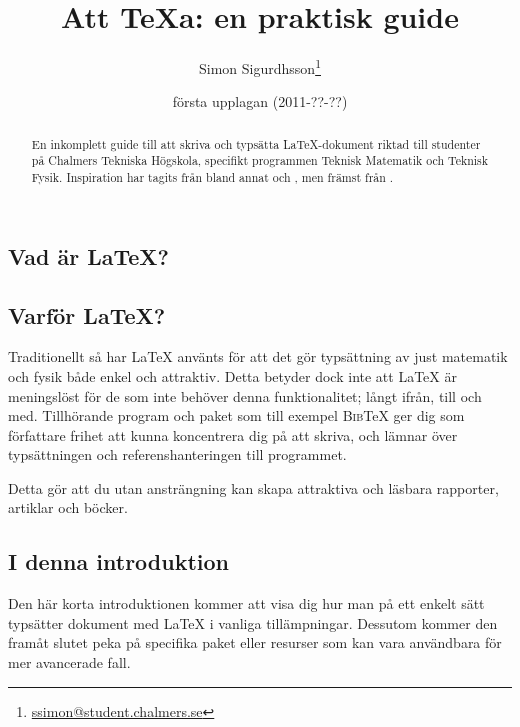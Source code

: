 \documentclass[swe,12pt]{skrapport}
\makeatletter
\newcommand\BibTeX{\textsc{Bib}\TeX}					%
\let\section@old=\section
\renewcommand\section{\@ifstar\my@section@star\my@section}
\newcommand\my@section[2][\@empty]{\newpage\ifx\@empty#1\section@old{#2}\else\section@old[#1]{#2}\fi}
\newcommand\my@section@star[2][\@empty]{\newpage\ifx\@empty#1\section@old*{#2}\else\section@old*[#1]{#2}\fi}
\makeatother
\begin{document}
	\begin{titlepage} %
		\title{Att \TeX{}a: en praktisk guide}
		\author{Simon Sigurdhsson\thanks{\url{ssimon@student.chalmers.se}}}
		\date{första upplagan (2011-??-??)}
		\maketitle
		\begin{abstract}
			En inkomplett guide till att skriva och typsätta \LaTeX-dokument riktad
			till studenter på Chalmers Tekniska Högskola, specifikt programmen
			Teknisk Matematik och Teknisk Fysik.
			Inspiration har tagits från bland annat  och
			, men främst från .
		\end{abstract}
	\end{titlepage} %
	
	\section*{Inledning}
	\subsection{Vad är \LaTeX?}
	
	\subsection{Varför \LaTeX?}
	Traditionellt så har \LaTeX{} använts för att det gör typsättning av just
	matematik och fysik både enkel och attraktiv. Detta betyder dock inte att
	\LaTeX{} är meningslöst för de som inte behöver denna funktionalitet; långt
	ifrån, till och med. Tillhörande program och paket som till exempel
	\BibTeX{} ger dig som författare frihet att kunna koncentrera dig på att
	skriva, och lämnar över typsättningen och referenshanteringen till
	programmet.
	
	Detta gör att du utan ansträngning kan skapa attraktiva och läsbara
	rapporter, artiklar och böcker.
	
	\subsection{I denna introduktion}
	Den här korta introduktionen kommer att visa dig hur man på ett enkelt
	sätt typsätter dokument med \LaTeX{} i vanliga tillämpningar.
	Dessutom kommer den framåt slutet peka på specifika paket eller
	resurser som kan vara användbara för mer avancerade fall.
	
\end{document}

